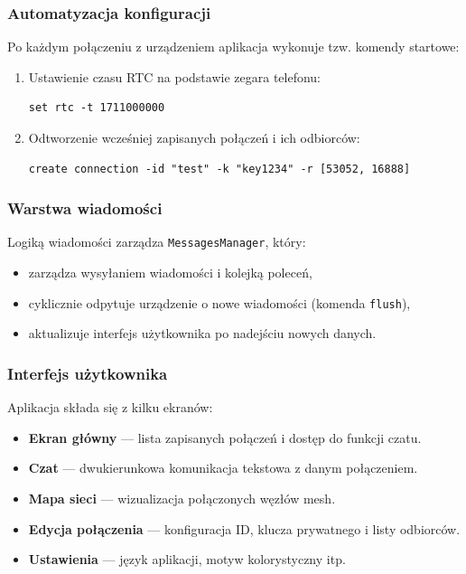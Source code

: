 \clearpage
\subsubsection{Automatyzacja konfiguracji}

Po każdym połączeniu z urządzeniem aplikacja wykonuje tzw. komendy startowe:
\begin{enumerate}
	\item Ustawienie czasu RTC na podstawie zegara telefonu:
		\begin{lstlisting}
set rtc -t 1711000000
		\end{lstlisting}
	\item Odtworzenie wcześniej zapisanych połączeń i ich odbiorców:
		\begin{lstlisting}
create connection -id "test" -k "key1234" -r [53052, 16888]
		\end{lstlisting}
\end{enumerate}

\subsubsection{Warstwa wiadomości}

Logiką wiadomości zarządza \texttt{MessagesManager}, który:
\begin{itemize}
	\item zarządza wysyłaniem wiadomości i kolejką poleceń,
	\item cyklicznie odpytuje urządzenie o nowe wiadomości (komenda \texttt{flush}),
	\item aktualizuje interfejs użytkownika po nadejściu nowych danych.
\end{itemize}

\subsubsection{Interfejs użytkownika}

Aplikacja składa się z kilku ekranów:
\begin{itemize}
	\item \textbf{Ekran główny} — lista zapisanych połączeń i dostęp do funkcji czatu.
	\item \textbf{Czat} — dwukierunkowa komunikacja tekstowa z danym połączeniem.
	\item \textbf{Mapa sieci} — wizualizacja połączonych węzłów mesh.
	\item \textbf{Edycja połączenia} — konfiguracja ID, klucza prywatnego i listy odbiorców.
	\item \textbf{Ustawienia} — język aplikacji, motyw kolorystyczny itp.
\end{itemize}

